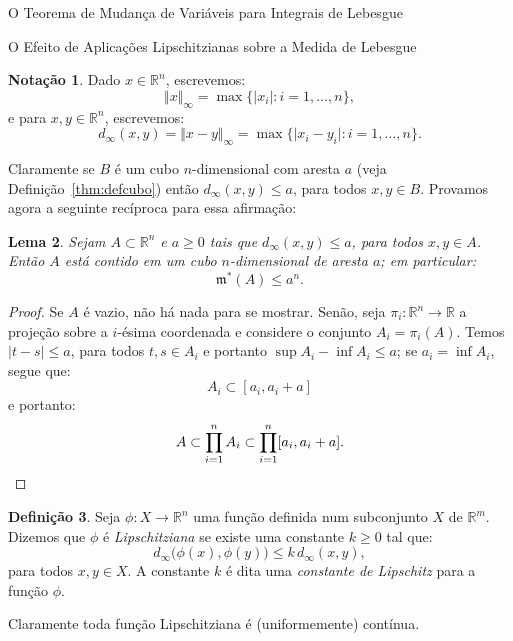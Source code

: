 \documentclass[oneside,final,11pt]{amsbook}
\newcommand{\R}{\mathds R}
\newcommand{\leb}{\mathfrak m}
\theoremstyle{remark}\newtheorem{exercise}{Exercício}[chapter]
\theoremstyle{remark}\newtheorem{*exercise}[exercise]{\hbox to 0pt{\hskip 0pt minus 1fil*}Exercício}
\theoremstyle{definition}\newtheorem{exdefin}{Definição}[chapter]
\theoremstyle{plain}\newtheorem{teo}{Teorema}[section]
\theoremstyle{plain}\newtheorem{lem}[teo]{Lema}
\theoremstyle{plain}\newtheorem{prop}[teo]{Proposição}
\theoremstyle{plain}\newtheorem{cor}[teo]{Corolário}
\theoremstyle{definition}\newtheorem{defin}[teo]{Definição}
\theoremstyle{remark}\newtheorem{rem}[teo]{Observação}
\theoremstyle{definition}\newtheorem{notation}[teo]{Notação}
\theoremstyle{definition}\newtheorem{convention}[teo]{Convenção}
\theoremstyle{definition}\newtheorem{example}[teo]{Exemplo}
\numberwithin{section}{chapter}
\numberwithin{equation}{section}
\begin{document}
\begin{chapter}{O Teorema de Mudança de Variáveis para Integrais de Lebesgue}
\label{CHP:MUDVAR}

\begin{section}{O Efeito de Aplicações Lipschitzianas sobre a Medida de Lebesgue}

\begin{notation}\label{not:normainfinito}
Dado $x\in\R^n$, escrevemos:
\[\Vert x\Vert_\infty=\max\big\{\vert x_i\vert:i=1,\ldots,n\big\},\]
e para $x,y\in\R^n$, escrevemos:
\[d_\infty(x,y)=\Vert x-y\Vert_\infty=\max\big\{\vert x_i-y_i\vert:i=1,\ldots,n\big\}.\]
\end{notation}
Claramente se $B$ é um cubo $n$-dimensional com aresta $a$ (veja Definição~\ref{thm:defcubo})
então $d_\infty(x,y)\le a$, para todos $x,y\in B$. Provamos agora a seguinte recíproca
para essa afirmação:

\begin{lem}\label{thm:lemadentrodocubo}
Sejam $A\subset\R^n$ e $a\ge0$ tais que $d_\infty(x,y)\le a$, para todos $x,y\in A$. Então
$A$ está contido em um cubo $n$-dimensional de aresta $a$; em particular:
\[\leb^*(A)\le a^n.\]
\end{lem}
\begin{proof}
Se $A$ é vazio, não há nada para se mostrar. Senão, seja $\pi_i:\R^n\to\R$ a projeção sobre
a $i$-ésima coordenada e considere o conjunto $A_i=\pi_i(A)$.
Temos $\vert t-s\vert\le a$, para todos $t,s\in A_i$ e portanto $\sup A_i-\inf A_i\le a$;
se $a_i=\inf A_i$, segue que:
\[A_i\subset[a_i,a_i+a]\]
e portanto:
\[A\subset\prod_{i=1}^nA_i\subset\prod_{i=1}^n[a_i,a_i+a].\qedhere\]
\end{proof}

\begin{defin}
Seja $\phi:X\to\R^n$ uma função definida num subconjunto $X$ de $\R^m$. Dizemos que $\phi$ é
{\em Lipschitziana\/}
se existe uma constante $k\ge0$ tal que:
\[d_\infty\big(\phi(x),\phi(y)\big)\le k\,d_\infty(x,y),\]
para todos $x,y\in X$. A constante $k$ é dita uma
{\em constante de Lipschitz\/}
para a função $\phi$.
\end{defin}
Claramente toda função Lipschitziana é (uniformemente) contínua.


\end{section}
\end{chapter}
\end{document}
